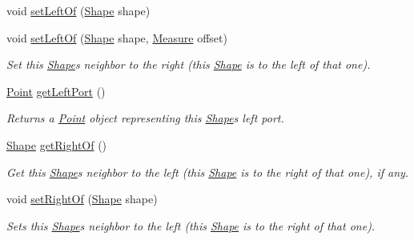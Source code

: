 \begin{DoxyCompactItemize}
void \hyperlink{classcom_1_1aarrelaakso_1_1drawl_1_1_shape_aad14fa860ab74cfa90815f56cf4c3ecf}{set\+Left\+Of} (\hyperlink{classcom_1_1aarrelaakso_1_1drawl_1_1_shape}{Shape} shape)
\item 
void \hyperlink{classcom_1_1aarrelaakso_1_1drawl_1_1_shape_aa1f77ee3e24986329b3618b76b2d12be}{set\+Left\+Of} (\hyperlink{classcom_1_1aarrelaakso_1_1drawl_1_1_shape}{Shape} shape, \hyperlink{classcom_1_1aarrelaakso_1_1drawl_1_1_measure}{Measure} offset)
\begin{DoxyCompactList}\small\item\em Set this \hyperlink{classcom_1_1aarrelaakso_1_1drawl_1_1_shape}{Shape}\textquotesingle{}s neighbor to the right (this \hyperlink{classcom_1_1aarrelaakso_1_1drawl_1_1_shape}{Shape} is to the left of that one). \end{DoxyCompactList}\item 
\hyperlink{classcom_1_1aarrelaakso_1_1drawl_1_1_point}{Point} \hyperlink{classcom_1_1aarrelaakso_1_1drawl_1_1_shape_aeffa96786ca552adf46924ec77da9555}{get\+Left\+Port} ()
\begin{DoxyCompactList}\small\item\em Returns a \hyperlink{classcom_1_1aarrelaakso_1_1drawl_1_1_point}{Point} object representing this \hyperlink{classcom_1_1aarrelaakso_1_1drawl_1_1_shape}{Shape}\textquotesingle{}s left port. \end{DoxyCompactList}\item 
\hyperlink{classcom_1_1aarrelaakso_1_1drawl_1_1_shape}{Shape} \hyperlink{classcom_1_1aarrelaakso_1_1drawl_1_1_shape_a1ad573b06f341aa79f6a255a476ae6e4}{get\+Right\+Of} ()
\begin{DoxyCompactList}\small\item\em Get this \hyperlink{classcom_1_1aarrelaakso_1_1drawl_1_1_shape}{Shape}\textquotesingle{}s neighbor to the left (this \hyperlink{classcom_1_1aarrelaakso_1_1drawl_1_1_shape}{Shape} is to the right of that one), if any. \end{DoxyCompactList}\item 
void \hyperlink{classcom_1_1aarrelaakso_1_1drawl_1_1_shape_a09e1586ce85c1d964cc3b7ce94bc5d4c}{set\+Right\+Of} (\hyperlink{classcom_1_1aarrelaakso_1_1drawl_1_1_shape}{Shape} shape)
\begin{DoxyCompactList}\small\item\em Sets this \hyperlink{classcom_1_1aarrelaakso_1_1drawl_1_1_shape}{Shape}\textquotesingle{}s neighbor to the left (this \hyperlink{classcom_1_1aarrelaakso_1_1drawl_1_1_shape}{Shape} is to the right of that one). \end{DoxyCompactList}\item 

\end{DoxyCompactItemize}
